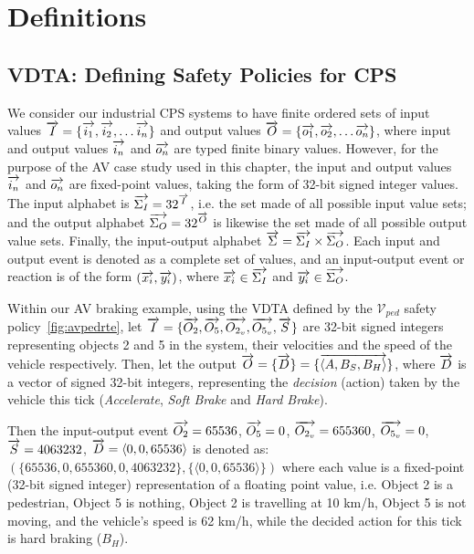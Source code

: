 \section{Definitions}
\subsection{\ac{VDTA}: Defining Safety Policies for \ac{CPS}}

We consider our industrial \ac{CPS} systems to have finite ordered sets of input values $\overrightarrow{I} = \{\overrightarrow{i_1}, \overrightarrow{i_2}, \ldots \overrightarrow{i_n}\}$ and output values $\overrightarrow{O} = \{\overrightarrow{o_1}, \overrightarrow{o_2}, \ldots \overrightarrow{o_n}\}$, where input and output values $\overrightarrow{i_n}$ and $\overrightarrow{o_n}$ are typed finite binary values.
However, for the purpose of the \ac{AV} case study used in this chapter, the input and output values $\overrightarrow{i_n}$ and $\overrightarrow{o_n}$ are fixed-point values, taking the form of 32-bit signed integer values.
The input alphabet is $\overrightarrow{\Sigma_I} = 32^{\overrightarrow{I}}$, i.e. the set made of all possible input value sets; and the output alphabet $\overrightarrow{\Sigma_O} = 32^{\overrightarrow{O}}$ is likewise the set made of all possible output value sets.
Finally, the input-output alphabet $\overrightarrow{\Sigma} = \overrightarrow{\Sigma_I} \times \overrightarrow{\Sigma_O}$. 
Each input and output event is denoted as a complete set of values, and an input-output event or reaction is of the form $(\overrightarrow{x_i}, \overrightarrow{y_i})$, where $\overrightarrow{x_i} \in \overrightarrow{\Sigma_I}$ and $\overrightarrow{y_i} \in \overrightarrow{\Sigma_O}$. 

\begin{example}
	\label{ex:io}
	Within our \ac{AV} braking example, using the \ac{VDTA} defined by the $\mathcal{V}_{ped}$ safety policy~\ref{fig:avpedrte}, let $\overrightarrow{I} = \{\overrightarrow{O_2}, \overrightarrow{O_5}, \overrightarrow{O_{2_v}}, \overrightarrow{O_{5_v}}, \overrightarrow{S}\}$ are 32-bit signed integers representing objects 2 and 5 in the system, their velocities and the speed of the vehicle respectively.
	Then, let the output $\overrightarrow{O} = \{\overrightarrow{D}\} = \{\overrightarrow{\langle A, B_S, B_H \rangle}\}$, where $\overrightarrow{D}$ is a vector of signed 32-bit integers, representing the \textit{decision} (action) taken by the vehicle this tick (\textit{Accelerate}, \textit{Soft Brake} and \textit{Hard Brake}).
	
	Then the input-output event $\overrightarrow{O_2}=65536$, $\overrightarrow{O_5}=0$, $\overrightarrow{O_{2_v}} = 655360$, $\overrightarrow{O_{5_v}} = 0$,  $\overrightarrow{S} = 4063232$, $\overrightarrow{D} = \langle 0, 0, 65536 \rangle$ is denoted as:\\$(\{65536, 0, 655360, 0, 4063232\}, \{\langle 0, 0, 65536 \rangle\})$ where each value is a fixed-point (32-bit signed integer) representation of a floating point value, i.e. Object 2 is a pedestrian, Object 5 is nothing, Object 2 is travelling at 10 km/h, Object 5 is not moving, and the vehicle's speed is 62 km/h, while the decided action for this tick is hard braking ($B_H$).
\end{example}

